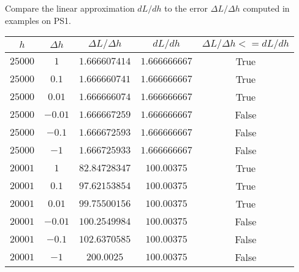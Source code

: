\documentclass{article}
\begin{document}
\begin{tcolorbox}
  Compare the linear approximation \( dL/dh \) to the error \( \Delta L / \Delta h \) computed in
  examples on PS1.
\end{tcolorbox}
\begin{center}
  \begin{tabular}{|c|c|c|c|c|}
    \hline
    $h$ & $\Delta h$ & $\Delta L / \Delta h$ & $dL / dh$ & $\Delta L / \Delta h <= dL / dh$ \\ \hline
    $25000$ & $1$ & $1.666607414$ & $1.666666667$ & True \\ \hline
    $25000$ & $0.1$ & $1.666660741$ & $1.666666667$ & True \\ \hline
    $25000$ & $0.01$ & $1.666666074$ & $1.666666667$ & True \\ \hline
    $25000$ & $-0.01$ & $1.666667259$ & $1.666666667$ & False \\ \hline
    $25000$ & $-0.1$ & $1.666672593$ & $1.666666667$ & False \\ \hline
    $25000$ & $-1$ & $1.666725933$ & $1.666666667$ & False \\ \hline
    $20001$ & $1$ & $82.84728347$ & $100.00375$ & True \\ \hline
    $20001$ & $0.1$ & $97.62153854$ & $100.00375$ & True \\ \hline
    $20001$ & $0.01$ & $99.75500156$ & $100.00375$ & True \\ \hline
    $20001$ & $-0.01$ & $100.2549984$ & $100.00375$ & False \\ \hline
    $20001$ & $-0.1$ & $102.6370585$ & $100.00375$ & False \\ \hline
    $20001$ & $-1$ & $200.0025$ & $100.00375$ & False \\ \hline
  \end{tabular}
\end{center}
\end{document}
